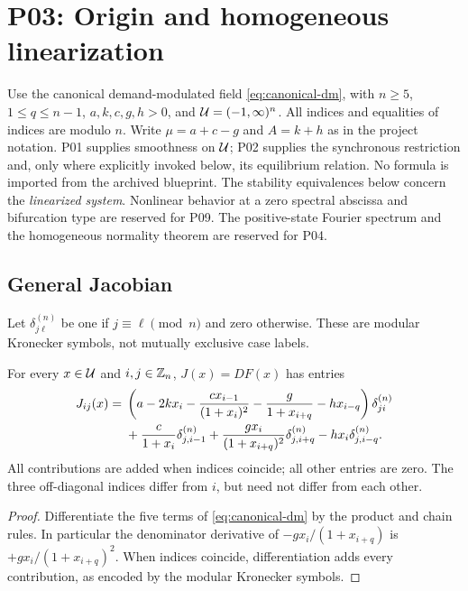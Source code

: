 \section{P03: Origin and homogeneous linearization}
\label{sec:P03}
Use the canonical demand-modulated field \eqref{eq:canonical-dm},
with $n\ge5$, $1\le q\le n-1$, $a,k,c,g,h>0$, and
$\mathcal{U}=(-1,\infty)^n$. All indices and equalities of indices are
modulo $n$. Write $\mu=a+c-g$ and $A=k+h$ as in the project notation.
P01 supplies smoothness on $\mathcal{U}$; P02 supplies the synchronous
restriction and, only where explicitly invoked below, its equilibrium
relation. No formula is imported from the archived blueprint.
The stability equivalences below concern the \emph{linearized system}.
Nonlinear behavior at a zero spectral abscissa and bifurcation type
are reserved for P09. The positive-state Fourier spectrum and the
homogeneous normality theorem are reserved for P04.

\subsection{General Jacobian}

Let $\delta^{(n)}_{j\ell}$ be one if $j\equiv\ell\pmod n$ and
zero otherwise. These are modular Kronecker symbols, not mutually
exclusive case labels.

\begin{lemma}
\label{lem:P03-jacobian}
For every $x\in\mathcal{U}$ and $i,j\in\mathbb{Z}_n$, $J(x)=DF(x)$ has entries
\begin{align}
 J_{ij}(x)={}&\left(a-2kx_i-\frac{c x_{i-1}}{(1+x_i)^2}
             -\frac{g}{1+x_{i+q}}-h x_{i-q}\right)
                 \delta^{(n)}_{ji}\notag\\
 &+\frac{c}{1+x_i}\delta^{(n)}_{j,i-1}
   +\frac{g x_i}{(1+x_{i+q})^2}\delta^{(n)}_{j,i+q}
   -h x_i\delta^{(n)}_{j,i-q}.
 \label{eq:P03-general-entries}
\end{align}
All contributions are added when indices coincide; all other entries
are zero. The three off-diagonal indices differ from $i$, but need
not differ from each other.
\end{lemma}
\begin{proof}
Differentiate the five terms of \eqref{eq:canonical-dm} by the product
and chain rules. In particular the denominator derivative of
$-gx_i/(1+x_{i+q})$ is $+gx_i/(1+x_{i+q})^2$.
When indices coincide, differentiation adds every contribution,
as encoded by the modular Kronecker symbols.
\end{proof}

